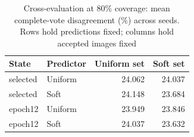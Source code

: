 \begin{table}[t]
\caption{Cross-evaluation at 80\% coverage: mean complete-vote disagreement (\%) across seeds. Rows hold predictions fixed; columns hold accepted images fixed}\label{tab:cross}
\centering\begin{tabular}{llrr}\toprule
State & Predictor & Uniform set & Soft set\\\midrule
selected & Uniform & 24.062 & 24.037\\
selected & Soft & 24.148 & 23.684\\
epoch12 & Uniform & 23.949 & 23.846\\
epoch12 & Soft & 24.037 & 23.632\\
\bottomrule\end{tabular}

\end{table}
